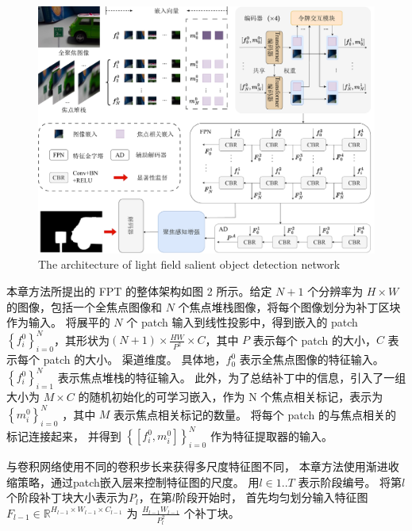 \begin{figure}[!ht]
	\centering
	\includegraphics[width=0.95\linewidth]{figures/chapter3/overview_1}
	{The architecture of light field salient object detection network}  
	\label{cpt3_fig1:overview}
\end{figure}




本章方法所提出的 FPT 的整体架构如图 2 所示。给定 $N + 1$ 个分辨率为 $ H \times W $ 的图像，包括一个全焦点图像和 $N$ 个焦点堆栈图像，将每个图像划分为补丁区块作为输入。 
将展平的 $N$ 个 patch 输入到线性投影中，得到嵌入的 patch $ \left \{ f_{i}^{0} \right \}_{i=0}^{N} $，其形状为$ \left ( N + 1 \right ) \times \frac{HW}{P^{2}} \times C  $，其中 $P$ 表示每个 patch 的大小，$C$ 表示每个 patch 的大小。 
渠道维度。 
%
%
%
具体地，$ f_{0}^{0} $ 表示全焦点图像的特征输入。 
$ \left \{ f_{i}^{0} \right \}_{i=1}^{N} $ 表示焦点堆栈的特征输入。 
此外，为了总结补丁中的信息，引入了一组大小为 $ M \times C $ 的随机初始化的可学习嵌入，作为 { }N 个焦点相关标记，表示为 $ \left \{ m_{i}^{0} \right \}_{i=0}^{N} $ ，其中 $M$ 表示焦点相关标记的数量。 
将每个 patch 的与焦点相关的标记连接起来，
并得到 $ \left \{ \left [ f_{i}^{0},m_{i}^{0}  \right ]  \right \}_{i=0}^{N} $ 作为特征提取器的输入。 




与卷积网络使用不同的卷积步长来获得多尺度特征图不同，
本章方法使用渐进收缩策略，通过patch嵌入层来控制特征图的尺度。
用$ l \in 1..T $ 表示阶段编号。 
将第$l$个阶段补丁块大小表示为$P_{l}$，在第$l$阶段开始时，
首先均匀划分输入特征图
$F_{l-1} \in \mathbb{R}^{H_{l-1} \times W_{l-1} \times C_{l-1}}$
为
$ \frac{H_{l-1}W_{l-1}}{P_{l}^{2}} $
个补丁块。





